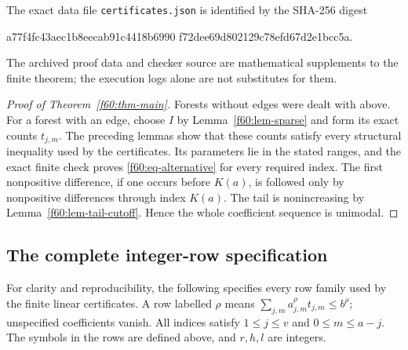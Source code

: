 The exact data file \texttt{certificates.json} is identified by the
SHA-256 digest
\begin{center}\small\ttfamily
a77f4fc43aec1b8eecab91c4418b6990\allowbreak
f72dee69d802129c78efd67d2e1bcc5a.
\end{center}
The archived proof data and checker source are mathematical supplements
to the finite theorem; the execution logs alone are not substitutes for
them.

\begin{proof}[Proof of Theorem~\ref{f60:thm-main}]
Forests without edges were dealt with above.  For a forest with an edge,
choose $I$ by Lemma~\ref{f60:lem-sparse} and form its exact counts
$t_{j,m}$.  The preceding lemmas show that these counts satisfy every
structural inequality used by the certificates.  Its parameters lie in
the stated ranges, and the exact finite check proves
\eqref{f60:eq-alternative} for every required index.  The first
nonpositive difference, if one occurs before $K(a)$, is followed only
by nonpositive differences through index $K(a)$.  The tail is nonincreasing
by Lemma~\ref{f60:lem-tail-cutoff}.  Hence the whole coefficient sequence
is unimodal.
\end{proof}

\subsection{The complete integer-row specification}
\label{f60:subsec-row-specification}

For clarity and reproducibility, the following specifies every row
family used by the finite linear certificates.  A row labelled $\rho$
means $\sum_{j,m}a^\rho_{j,m}t_{j,m}\le b^\rho$; unspecified
coefficients vanish.  All indices satisfy $1\le j\le v$ and
$0\le m\le a-j$.  The symbols in the rows are defined above, and
$r,h,l$ are integers.

